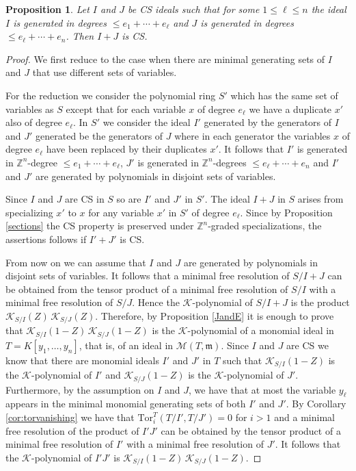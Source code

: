 \documentclass{amsart}
\newtheorem{proposition}[theorem]{Proposition}
\theoremstyle{definition}
\numberwithin{equation}{section}
\def\mm{\mathfrak{m}}
\newcommand{\M}{{\mathcal M}}
\def\ZZ{\mathbb{Z}}
\def\cK{\mathcal{K}}
\begin{document}
  \begin{proposition} 
   \label{prop:linked} 
   Let $I$ and $J$ be CS ideals 
  such that for some $1 \leq \ell \leq n$ the ideal $I$ 
  is generated in degrees $\leq e_1 + \cdots + e_\ell$ 
  and $J$ is generated in degrees $\leq e_\ell + \cdots + e_n$. 
  Then $I+J$ is CS.
  \end{proposition}
\begin{proof}
We first reduce to the case when there are minimal generating sets of $I$ and $J$ that use different sets of variables. 

For the reduction we consider the polynomial ring $S'$ which has the same set of variables as $S$ except that for each variable $x$ 
of degree $e_\ell$ we have a duplicate $x'$ also of degree $e_\ell$. In $S'$ we consider
the ideal $I'$ generated by the generators of
$I$ and $J'$ generated be the generators of $J$ where in each generator the variables
$x$ of degree $e_\ell$ have been replaced by
their duplicates $x'$. It follows that 
$I'$ is generated in $\ZZ^n$-degree $\leq e_1+\cdots +e_\ell$, $J'$ is generated in 
$\ZZ^ n$-degrees $\leq e_\ell+\cdots +e_n$ and
$I'$ and $J'$ are generated by polynomials in 
disjoint sets of variables.

Since $I$ and $J$ are
CS in $S$ so are $I'$ and $J'$ in $S'$. 
The ideal $I+J$ in $S$ arises from 
specializing $x'$ to $x$ for any variable $x'$
in $S'$ of degree $e_\ell$. Since by Proposition \ref{sections} the CS property is preserved under $\ZZ^n$-graded specializations, the
assertions follows if $I'+J'$ is CS.

From now on we can assume that $I$ and $J$ 
are generated by polynomials in disjoint sets of variables. It follows that a minimal free
resolution of
$S/I+J$ can be obtained from the tensor product of a minimal free resolution of $S/I$ with a minimal free resolution of $S/J$. Hence the $\cK$-polynomial of $S/I+J$ is the product $\cK_{S/I}(Z)\,\cK_ {S/J}(Z)$.  
Therefore, by Proposition \ref{JandE} it is enough to prove that $\cK_{S/I}(1-Z)\,\cK_{S/J}(1-Z)$  is the $\cK$-polynomial of a monomial ideal in  $T=K[y_1,\ldots,y_n]$, that is, of an ideal in $\M(T,\mm)$.
Since $I$ and $J$ are CS we know that there are monomial ideals $I'$ and $J'$ in  $T$ such that $\cK_{S/I}(1-Z)$ is the $\cK$-polynomial of $I'$  and  $\cK_{S/J}(1-Z)$ is the 
$\cK$-polynomial of $J'$. 
Furthermore, by the assumption on $I$ and $J$, we have that at most the variable $y_\ell$
appears in the minimal monomial generating sets of both $I'$ and $J'$.  By Corollary \ref{cor:torvanishing}
we have that $\mathrm{Tor}_i^T(T/I',T/J')=0$ for $i>1$ 
and a minimal free resolution of the product of  $I'J'$ can be obtained by the tensor product of a minimal free
resolution of $I'$ with a minimal free resolution of $J'$. It follows that the $\cK$-polynomial of $I'J'$ is $\cK_{S/I}(1-Z)\,\cK_{S/J}(1-Z)$.
\end{proof}
   
\end{document}

